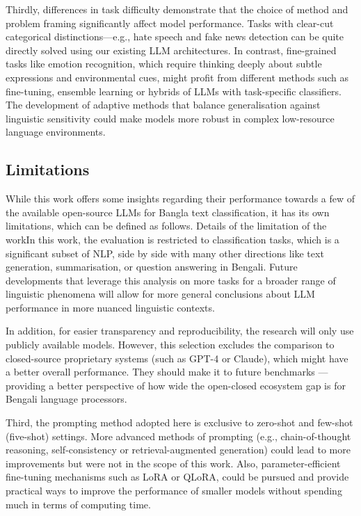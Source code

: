 \documentclass[10pt,letterpaper]{article}
\begin{document}
Thirdly, differences in task difficulty demonstrate that the choice of method and problem framing significantly affect model performance. Tasks with clear-cut categorical distinctions—e.g., hate speech and fake news detection can be quite directly solved using our existing LLM architectures. In contrast, fine-grained tasks like emotion recognition, which require thinking deeply about subtle expressions and environmental cues, might profit from different methods such as fine-tuning, ensemble learning or hybrids of LLMs with task-specific classifiers. The development of adaptive methods that balance generalisation against linguistic sensitivity could make models more robust in complex low-resource language environments.


\subsection*{Limitations}

While this work offers some insights regarding their performance towards a few of the available open-source LLMs for Bangla text classification, it has its own limitations, which can be defined as follows. Details of the limitation of the workIn this work, the evaluation is restricted to classification tasks, which is a significant subset of NLP, side by side with many other directions like text generation, summarisation, or question answering in Bengali. Future developments that leverage this analysis on more tasks for a broader range of linguistic phenomena will allow for more general conclusions about LLM performance in more nuanced linguistic contexts.

In addition, for easier transparency and reproducibility, the research will only use publicly available models. However, this selection excludes the comparison to closed-source proprietary systems (such as GPT-4 or Claude), which might have a better overall performance. They should make it to future benchmarks — providing a better perspective of how wide the open-closed ecosystem gap is for Bengali language processors.

Third, the prompting method adopted here is exclusive to zero-shot and few-shot (five-shot) settings. More advanced methods of prompting (e.g., chain-of-thought reasoning, self-consistency or retrieval-augmented generation) could lead to more improvements but were not in the scope of this work. Also, parameter-efficient fine-tuning mechanisms such as LoRA or QLoRA, could be pursued and provide practical ways to improve the performance of smaller models without spending much in terms of computing time.
\end{document}
